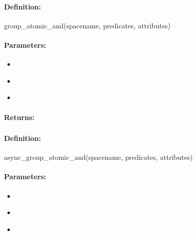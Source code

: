 \paragraph{Definition:}
\begin{rubycode}
group_atomic_and(spacename, predicates, attributes)
\end{rubycode}

\paragraph{Parameters:}
\begin{itemize}[noitemsep]
\item {}\\

\item {}\\

\item {}\\

\end{itemize}

\paragraph{Returns:}


\pagebreak
\subsubsection{}
\label{api:ruby:async_group_atomic_and}


\paragraph{Definition:}
\begin{rubycode}
async_group_atomic_and(spacename, predicates, attributes)
\end{rubycode}

\paragraph{Parameters:}
\begin{itemize}[noitemsep]
\item {}\\

\item {}\\

\item {}\\

\end{itemize}

